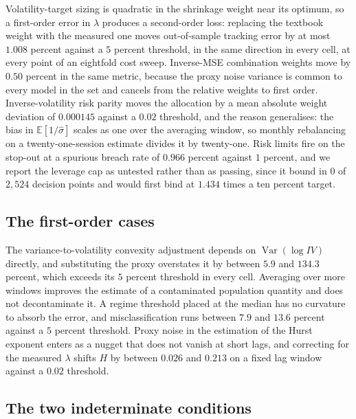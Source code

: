 Volatility-target sizing is quadratic in the shrinkage weight near its optimum, so
a first-order error in $\lambda$ produces a second-order loss: replacing the
textbook weight with the measured one moves out-of-sample tracking error by at
most $1.008$ percent against a $5$ percent threshold, in the same direction in %
every cell, at every point of an eightfold cost sweep. Inverse-MSE combination
weights move by $0.50$ percent in the same metric, because the proxy noise %
variance is common to every model in the set and cancels from the relative
weights to first order. Inverse-volatility risk parity moves the allocation by a
mean absolute weight deviation of $0.000145$ against a $0.02$ threshold, and the %
reason generalises: the bias in $\mathbb{E}[1/\hat{\sigma}]$ scales as one over
the averaging window, so monthly rebalancing on a twenty-one-session estimate
divides it by twenty-one. Risk limits fire on the stop-out at a spurious breach
rate of $0.966$ percent against $1$ percent, and we report the leverage cap as %
untested rather than as passing, since it bound in $0$ of $2{,}524$ decision
points and would first bind at $1.434$ times a ten percent target. %

\subsection{The first-order cases}

The variance-to-volatility convexity adjustment depends on
$\operatorname{Var}(\log IV)$ directly, and substituting the proxy overstates it
by between $5.9$ and $134.3$ percent, which exceeds its $5$ percent threshold in %
every cell. Averaging over more windows improves the estimate of a contaminated
population quantity and does not decontaminate it. A regime threshold placed at
the median has no curvature to absorb the error, and misclassification runs
between $7.9$ and $13.6$ percent against a $5$ percent threshold. Proxy noise in %
the estimation of the Hurst exponent enters as a nugget that does not vanish at
short lags, and correcting for the measured $\lambda$ shifts $H$ by between
$0.026$ and $0.213$ on a fixed lag window against a $0.02$ threshold. %

\subsection{The two indeterminate conditions}

